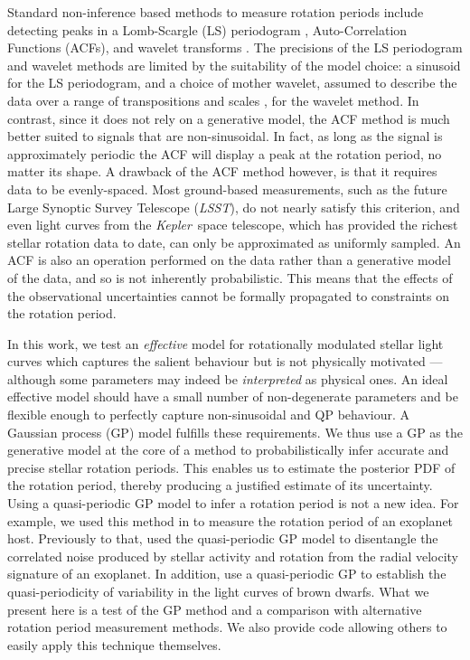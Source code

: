 \documentclass[a4paper,fleqn,usenatbib,useAMS]{mnras}
\newcommand{\response}[1]{{#1}}
\newcommand{\Kepler}{{\it Kepler}}
\newcommand{\LSST}{{\it LSST}}
\newcommand{\eg}{{\it e.g.}}
\begin{document}
Standard non-inference based methods to measure rotation periods include
detecting peaks in a Lomb-Scargle \citep{Lomb1976, Scargle1982} (LS)
periodogram \citep[\eg][]{Reinhold2013}, Auto-Correlation Functions (ACFs),
\citep[\eg][]{Mcquillan13b} and wavelet transforms \citep[\eg][]{Garcia2014}.
The precisions of the LS periodogram and wavelet methods are limited by the
suitability of the model choice: a sinusoid for the LS periodogram, and a
choice of mother wavelet, assumed to describe the data over a range of
transpositions and scales \citep[see, \eg][]{Carter2010}, for the wavelet
method.
In contrast, since it does not rely on a generative model, the ACF method is
much better suited to signals that are non-sinusoidal.
In fact, as long as the signal is approximately periodic the ACF will
display a peak at the rotation period, no matter its shape.
A drawback of the ACF method however, is that it requires data to be
evenly-spaced.
Most ground-based measurements, such as the future Large Synoptic Survey
Telescope (\LSST), do not nearly satisfy this criterion, and even
light curves from the \Kepler\ space telescope, which has provided the richest
stellar rotation data to date, can only be approximated as uniformly sampled.
An ACF is also an operation performed on the data rather than a generative
model of the data, and so is not inherently probabilistic.
This means that the effects of the observational uncertainties cannot be
formally propagated to constraints on the rotation period.

In this work, we test an {\it effective} model for rotationally modulated
stellar light curves which captures the salient behaviour but is not
physically motivated --- although some parameters may indeed be {\it
interpreted} as physical ones.
An ideal effective model should have a small number of non-degenerate
parameters and be flexible enough to perfectly capture non-sinusoidal and QP
behaviour.
A Gaussian process (GP) model fulfills these requirements. We thus use a GP
as the generative model at the core of a method to probabilistically
infer accurate and precise stellar rotation periods.
This enables us to estimate the posterior PDF of the rotation period, thereby
producing a justified estimate of its uncertainty.
\response{Using a quasi-periodic GP model to infer a rotation period is not a new
idea.
For example, we used this method in \citet{Vanderburg2015} to measure the
rotation period of an exoplanet host.
Previously to that, \citet{Haywood2014} used the quasi-periodic GP model
to disentangle the correlated noise produced by stellar activity and rotation
from the radial velocity signature of an exoplanet.
In addition, \citet{Littlefair2017} use a quasi-periodic GP to establish the
quasi-periodicity of variability in the light curves of brown dwarfs.
What we present here is a test of the GP method and a comparison with
alternative rotation period measurement methods.
We also provide code allowing others to easily apply this technique
themselves.}
\end{document}
